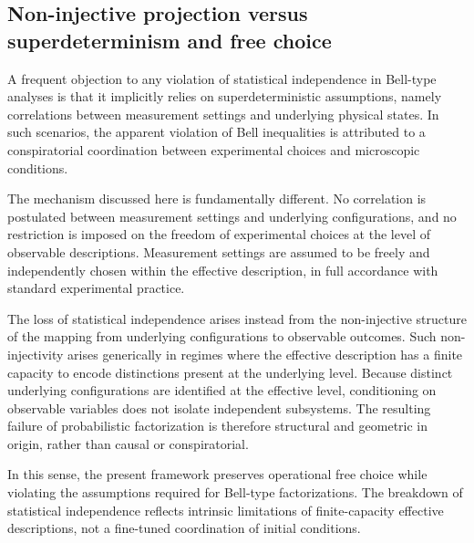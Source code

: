 \subsection{Non-injective projection versus superdeterminism and free choice}
  \label{subsec:free-choice}

  A frequent objection to any violation of statistical independence in Bell-type analyses
  is that it implicitly relies on superdeterministic assumptions, namely correlations
  between measurement settings and underlying physical states.
  In such scenarios, the apparent violation of Bell inequalities is attributed to a
  conspiratorial coordination between experimental choices and microscopic conditions.

  The mechanism discussed here is fundamentally different.
  No correlation is postulated between measurement settings and underlying
  configurations, and no restriction is imposed on the freedom of experimental choices
  at the level of observable descriptions.
  Measurement settings are assumed to be freely and independently chosen within the
  effective description, in full accordance with standard experimental practice.

  The loss of statistical independence arises instead from the non-injective structure
  of the mapping from underlying configurations to observable outcomes.
  Such non-injectivity arises generically in regimes where the effective description
  has a finite capacity to encode distinctions present at the underlying level.
  Because distinct underlying configurations are identified at the effective level,
  conditioning on observable variables does not isolate independent subsystems.
  The resulting failure of probabilistic factorization is therefore structural and
  geometric in origin, rather than causal or conspiratorial.

  In this sense, the present framework preserves operational free choice while violating
  the assumptions required for Bell-type factorizations.
  The breakdown of statistical independence reflects intrinsic limitations of
  finite-capacity effective descriptions, not a fine-tuned coordination of initial conditions.
